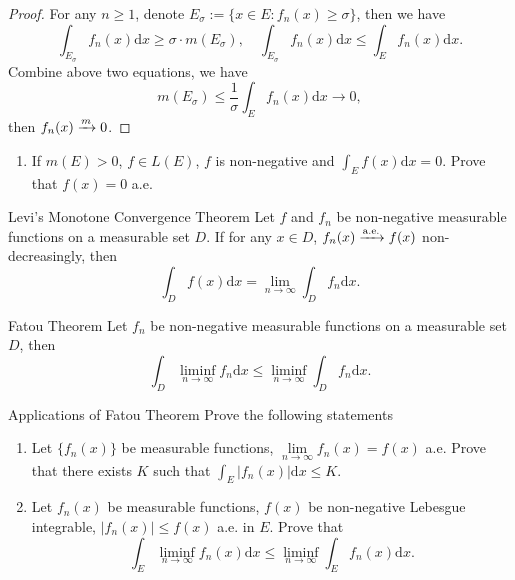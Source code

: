 \begin{proof}
  For any $n \geq 1$,
  denote $E_{\sigma} := \{x \in E: f_n(x) \geq \sigma\}$, then we have
  \begin{equation}
    \int_{E_{\sigma}}f_n(x)\mathrm{d} x \geq \sigma \cdot m (E_{\sigma}), \quad
    \int_{E_{\sigma}}f_n(x) \mathrm{d} x \leq \int_E f_n(x) \mathrm{d} x.
  \end{equation}
  Combine above two equations, we have
  \begin{equation}
    m(E_{\sigma}) \leq \frac{1}{\sigma} \int_E f_n(x)\mathrm{d} x \rightarrow 0,
  \end{equation}
  then $f_n(x) \xrightarrow{m} 0$.
\end{proof}

\begin{exercise}{}{}
  \begin{enumerate}
  \item If $m(E) > 0$, $f \in L(E)$, $f$ is non-negative and $\int_E f(x)\mathrm{d} x = 0$.
    Prove that $f(x) = 0$ a.e.
  \end{enumerate}
\end{exercise}

\begin{theorem}{Levi's Monotone Convergence Theorem}{}
  Let $f$ and $f_n$ be non-negative measurable functions on a measurable set
  $D$.
  If for any $x \in D$, $f_n(x) \xrightarrow{\text{a.e.}} f(x)$ non-decreasingly, then
  \begin{equation}
    \int_D f(x)\mathrm{d} x = \lim \limits _{n \rightarrow \infty} \int_D f_n\mathrm{d} x.
  \end{equation}
\end{theorem}

\begin{theorem}{Fatou Theorem}{}
  Let $f_n$ be non-negative measurable functions on a measurable set $D$,
  then
  \begin{equation}
    \int_D \liminf \limits_{n \rightarrow \infty} f_n\mathrm{d} x
    \leq \liminf \limits_{n \rightarrow \infty} \int_D f_n\mathrm{d} x.
  \end{equation}
\end{theorem}

\begin{example}{Applications of Fatou Theorem}{}
  Prove the following statements
  \begin{enumerate}
  \item Let $\{f_n(x)\}$ be measurable functions, $\lim \limits _{n \rightarrow \infty} f_n(x) = f(x)$ a.e.
    Prove that there exists $K$ such that $\int_E |f_n(x)| \mathrm{d} x \leq K$.
  \item Let $f_n(x)$ be measurable functions, $f(x)$ be non-negative Lebesgue integrable,
    $|f_n(x)| \leq f(x)$ a.e. in $E$. Prove that
    \begin{equation}
      \int_E \liminf_{n \rightarrow \infty} f_n(x) \mathrm{d} x \leq \liminf _{n \rightarrow \infty} \int_E f_n(x)\mathrm{d} x.
    \end{equation}
  \end{enumerate}
\end{example}

